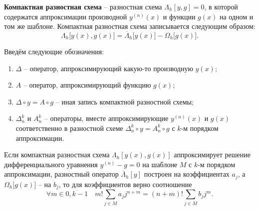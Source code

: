 \documentclass[../main.tex]{subfile}
\begin{document}
\begin{define}
	\textbf{Компактная разностная схема} -- разностная схема
	$\Lambda_h[y,g]=0$, в которой содержатся аппроксимации производной
	$y^{(n)}(x)$ и функции $g(x)$ на одном и том же шаблоне. Компактная
	разностная схема записывается следующим образом:
	\[\Lambda_h\big[y(x),g(x)\big]=\overline{\Lambda}_h\big[y(x)\big]-
	\Omega_h\big[g(x)].\]
\end{define}

\begin{define}
	Введём следующие обозначения:
	\begin{enumerate}[nosep]
		\item $\Delta$ -- оператор, аппроксимирующий какую-то
			производную $y(x)$;
		\item $A$ -- оператор, аппроксимирующий функцию $g(x)$;
		\item $\Delta\circ y=A\circ g$ -- иная запись компактной
			разностной схемы;
		\item $\Delta_n^k$ и $A_n^k$ -- операторы, вместе
			аппроксимирующие $y^{(n)}(x)$ и $g(x)$ соответственно в
			разностной схеме $\Delta_n^k\circ y=A_n^k\circ g$
			с $k$-м порядком аппроксимации.
	\end{enumerate}
\end{define}

\begin{theorem}
\label{eq:compact_difference_scheme_theorem}
	Если компактная разностная схема $\Lambda_h[y(x),g(x)]$ аппроксимирует
	решение дифференциального уравнения $y^{(n)}-g=0$ на шаблоне $M$ с $k$-м
	порядком аппроксимации, разностный оператор $\overline{\Lambda}_h[y]$
	построен на коэффициентах $a_j$, а $\Omega_h\big[g(x)]$ -- на $b_j$, то
	для коэффициентов верно соотношение
	\[\boxed{\forall m\in\overline{0,k-1}\quad m!\sum_{j\in M}a_jj^{n+m}=
	(n+m)!\sum_{j\in M}b_jj^m}.\]
\end{theorem}
\end{document}

